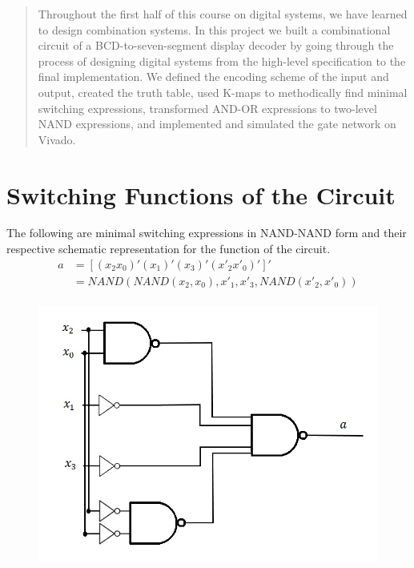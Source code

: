 \documentclass{article}
\begin{document}
\begin{abstract}
Throughout the first half of this course on digital systems, we have learned 
to design combination systems. In this project we built a combinational 
circuit of a BCD-to-seven-segment display decoder by going through the process 
of designing digital systems from the high-level specification to the final 
implementation.  We defined the encoding scheme of the input and output, 
created the truth table, used K-maps to methodically find minimal switching 
expressions, transformed AND-OR expressions to two-level NAND expressions, 
and implemented and simulated the gate network on Vivado.
\end{abstract}


\section{Switching Functions of the Circuit}
The following are minimal switching expressions in NAND-NAND form and their 
respective schematic representation for the function of the circuit.\\

\begin{equation*}
\begin{split}
a & = [ (x_2 x_0)'  (x_1)'  (x_3)'  (x'_2 x'_0)']' \\
  & = NAND(NAND(x_2, x_0), x'_1, x'_3, NAND(x'_2, x'_0)) \\
\end{split}
\end{equation*}
\begin{figure}[h!]
\centering
\includegraphics[scale=0.25]{a-NAND-NAND}
\end{figure}
\end{document}
